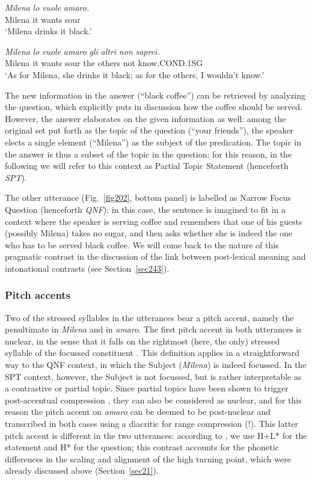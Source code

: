 \ea
\gll \textit{Milena} \textit{lo} \textit{vuole} \textit{amaro.}\\
Milena it wants sour\\
\glt ‘Milena drinks it black.’
\z

\ea
\gll \textit{Milena} \textit{lo} \textit{vuole} \textit{amaro} \textit{gli} \textit{altri} \textit{non} \textit{saprei.}\\
Milena it wants sour the others not know.COND.1SG\\
\glt ‘As for Milena, she drinks it black; as for the others, I wouldn't know.’
\z

The new information in the answer (``black coffee'') can be retrieved by analyzing the question, which explicitly puts in discussion how the coffee should be served. However, the answer elaborates on the given information as well: among the original set put forth as the topic of the question (``your friends''), the speaker elects a single element (``Milena'') as the subject of the predication. The topic in the answer is thus a subset of the topic in the question: for this reason, in the following we will refer to this context as Partial Topic Statement (henceforth \textit{SPT}). 

The other utterance (Fig.~\ref{fig202}, bottom panel) is labelled as Narrow Focus Question (henceforth \textit{QNF}): in this case, the sentence is imagined to fit in a context where the speaker is serving coffee and remembers that one of his guests (possibly Milena) takes no sugar, and then asks whether she is indeed the one who has to be served black coffee. We will come back to the nature of this pragmatic contrast in the discussion of the link between post-lexical meaning and intonational contrasts (see Section~\ref{sec243}).

\subsubsection{Pitch accents}\label{sec2122}
Two of the stressed syllables in the utterances bear a pitch accent, namely the penultimate in \textit{Milena} and in \textit{amaro}. The first pitch accent in both utterances is nuclear, in the sense that it falls on the rightmost (here, the only) stressed syllable of the focussed constituent \cite[380]{grice2005strategy}. This definition applies in a straightforward way to the QNF context, in which the Subject (\textit{Milena}) is indeed focussed. In the SPT context, however, the Subject is not focussed, but is rather interpretable as a contrastive or partial topic. Since partial topics have been shown to trigger post-accentual compression \citep{dimperio2011phrasing}, they can also be considered as nuclear, and for this reason the pitch accent on \textit{amaro} can be deemed to be post-nuclear and transcribed in both cases using a diacritic for range compression (!). This latter pitch accent is different in the two utterances: according to \citet{grice2005strategy}, we use H+L* for the statement and H* for the question; this contrast accounts for the phonetic differences in the scaling and alignment of the high turning point, which were already discussed above (Section~\ref{sec21}). 

